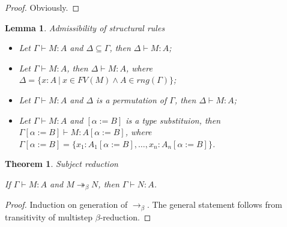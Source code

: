 \documentclass[a4paper]{article}
\newtheorem{lemma}{Lemma}
\newtheorem{theorem}{Theorem}
\begin{document}
\begin{proof}

  Obviously.

\end{proof}

\begin{lemma} Admissibility of structural rules

  \begin{itemize}
    \item Let $\Gamma \vdash M : A$ and $\Delta \subseteq \Gamma$, then $\Delta \vdash M : A$;
    \item Let $\Gamma \vdash M : A$, then $\Delta \vdash M : A$, where $\Delta = \{ x : A \: | \: x \in FV(M) \land A \in rng(\Gamma)\}$;
    \item Let $\Gamma \vdash M : A$ and $\Delta$ is a permutation of $\Gamma$, then $\Delta \vdash M : A$;
    \item Let $\Gamma \vdash M : A$ and $[\alpha := B]$ is a type substituion, then $\Gamma [\alpha := B] \vdash M : A [\alpha := B]$,
    where $\Gamma [\alpha := B] = \{ x_1 : A_1 [\alpha := B], \dots, x_n : A_n [\alpha := B]\}$.
  \end{itemize}
\end{lemma}

\begin{theorem} Subject reduction

  If $\Gamma \vdash M : A$ and $M \twoheadrightarrow_{\beta} N$, then $\Gamma \vdash N : A$.
\end{theorem}

\begin{proof}

  Induction on generation of $\rightarrow_{\beta}$. The general statement follows from transitivity of
  multistep $\beta$-reduction.
\end{proof}
\end{document}
